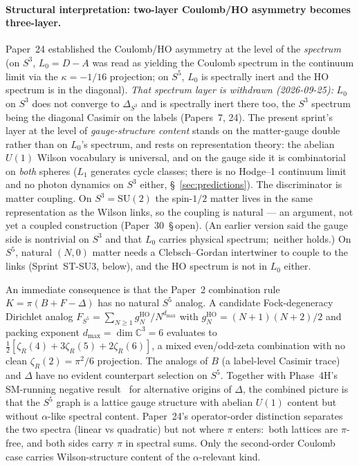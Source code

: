 \documentclass[aps,pra,twocolumn,superscriptaddress,longbibliography]{revtex4-2}
\begin{document}
\paragraph*{Structural interpretation: two-layer Coulomb/HO
asymmetry becomes three-layer.} Paper~24 established the
Coulomb/HO asymmetry at the level of the \emph{spectrum} (on
$S^3$, $L_0 = D - A$ was read as yielding the Coulomb spectrum in the
continuum limit via the $\kappa = -1/16$ projection; on $S^5$, $L_0$ is
spectrally inert and the HO spectrum is in the diagonal).  \emph{That
spectrum layer is withdrawn (2026-09-25):} $L_0$ on $S^3$ does not
converge to $\Delta_{S^3}$ and is spectrally inert there too, the $S^3$
spectrum being the diagonal Casimir on the labels (Papers~7, 24).  The
present sprint's layer at the level of \emph{gauge-structure content}
stands on the matter-gauge double rather than on $L_0$'s spectrum, and
rests on representation theory: the abelian $U(1)$ Wilson vocabulary
is universal, and on the gauge side it is combinatorial on \emph{both}
spheres ($L_1$ generates cycle classes; there is no Hodge--1 continuum
limit and no photon dynamics on $S^3$ either,
\S~\ref{sec:predictions}).  The discriminator is matter coupling.  On $S^3 =
\mathrm{SU}(2)$ the spin-$1/2$ matter lives in the same representation
as the Wilson links, so the coupling is natural --- an argument, not yet
a coupled construction (Paper~30~\S\,open).  (An earlier version said
the gauge side is nontrivial on $S^3$ and that $L_0$ carries physical
spectrum;\ neither holds.)  On $S^5$, natural $(N,0)$ matter needs a
Clebsch--Gordan intertwiner to couple to the links (Sprint~ST-SU3,
below), and the HO spectrum is not in $L_0$ either.

An immediate consequence is that the Paper~2 combination rule
$K = \pi(B + F - \Delta)$ has no natural $S^5$ analog.  A candidate
Fock-degeneracy Dirichlet analog $F_{S^5} = \sum_{N \geq 1}
g_N^{\text{HO}} / N^{d_{\max}}$ with
$g_N^{\text{HO}} = (N+1)(N+2)/2$ and packing exponent
$d_{\max} = \dim \mathbb{C}^3 = 6$ evaluates to
$\tfrac{1}{2}[\zeta_R(4) + 3\zeta_R(5) + 2\zeta_R(6)]$, a mixed
even/odd-zeta combination with no clean $\zeta_R(2) = \pi^2/6$
projection.  The analogs of $B$ (a label-level Casimir trace) and
$\Delta$ have no evident counterpart selection on $S^5$.  Together with Phase~4H's SM-running negative
result~\cite{Paper2} for alternative origins of $\Delta$, the
combined picture is that the $S^5$ graph is a lattice gauge
structure with abelian $U(1)$ content but without $\alpha$-like
spectral content.  Paper~24's operator-order distinction separates the two
spectra (linear vs quadratic) but not where $\pi$ enters:\ both
lattices are $\pi$-free, and both sides carry $\pi$ in spectral
sums.  Only the second-order Coulomb case carries
Wilson-structure content of the $\alpha$-relevant kind.
\end{document}
